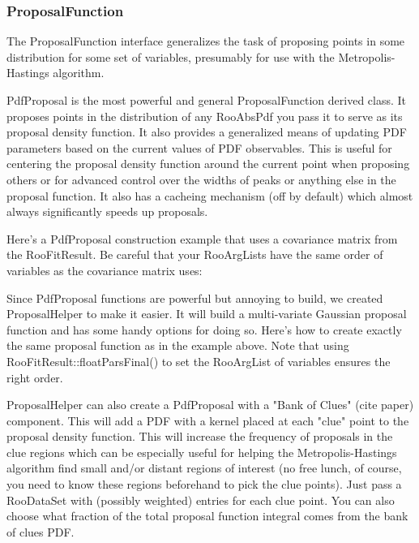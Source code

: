 \documentclass[11pt]{article}
\begin{document}
	\subsubsection{ProposalFunction}
	\label{sec:ProposalFunction}
	The ProposalFunction interface generalizes the task of proposing points in some distribution for some set of variables, presumably for use with the Metropolis-Hastings algorithm.
	
	PdfProposal is the most powerful and general ProposalFunction derived class.  It proposes points in the distribution of any RooAbsPdf you pass it to serve as its proposal density function.  It also provides a generalized means of updating PDF parameters based on the current values of PDF observables.  This is useful for centering the proposal density function around the current point when proposing others or for advanced control over the widths of peaks or anything else in the proposal function.  It also has a cacheing mechanism (off by default) which almost always significantly speeds up proposals.
	
	Here's a PdfProposal construction example that uses a covariance matrix from the RooFitResult.  Be careful that your RooArgLists have the same order of variables as the covariance matrix uses:
	
	
	
	Since PdfProposal functions are powerful but annoying to build, we created ProposalHelper to make it easier.  It will build a multi-variate Gaussian proposal function and has some handy options for doing so.  Here's how to create exactly the same proposal function as in the example above.  Note that using RooFitResult::floatParsFinal() to set the RooArgList of variables ensures the right order.
	
	
	
	ProposalHelper can also create a PdfProposal with a "Bank of Clues" (cite paper) component.  This will add a PDF with a kernel placed at each "clue" point to the proposal density function.  This will increase the frequency of proposals in the clue regions which can be especially useful for helping the Metropolis-Hastings algorithm find small and/or distant regions of interest (no free lunch, of course, you need to know these regions beforehand to pick the clue points).  Just pass a RooDataSet with (possibly weighted) entries for each clue point.  You can also choose what fraction of the total proposal function integral comes from the bank of clues PDF.
	
\end{document}

